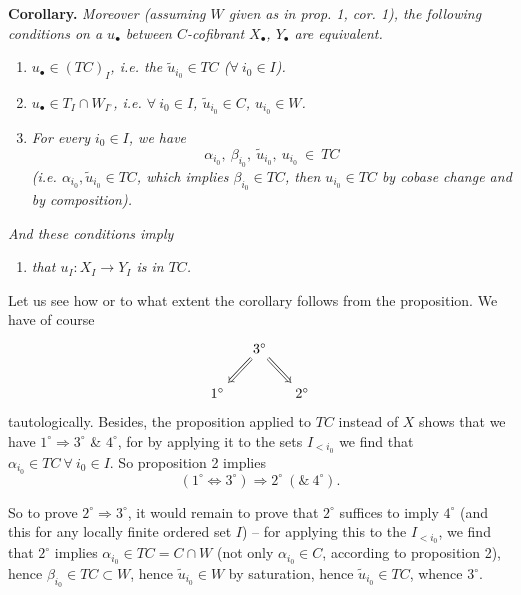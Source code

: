 \documentclass[11pt]{article}
\newcommand{\printedpage}[1]{\marginpar{\footnotesize p.~#1}}
\newcommand{\msp}[1]{\marginpar{\footnotesize [#1]}}
\begin{document}
\textbf{Corollary.} \textit{Moreover (assuming $W$ given as in prop. 1, cor. 1), the following conditions on a $u_{\bullet}$ between $C$-cofibrant $X_{\bullet}$, $Y_{\bullet}$ are equivalent.}
\begin{enumerate}
\item[$1^{\circ}$)] \textit{$u_{\bullet} \in (TC)_I$, i.e. the $\tilde{u}_{i_0} \in TC$ ($\forall\ i_0 \in I$).}
\item[$2^{\circ}$)] \textit{$u_{\bullet} \in T_I \cap W_{I^{\circ}}$, i.e. $\forall\ i_0 \in I$, $\tilde{u}_{i_0} \in C$, $u_{i_0} \in W$.} %
\item[$3^{\circ}$)] \textit{For every $i_0 \in I$, we have}
\[
\alpha_{i_0},\ \beta_{i_0},\ \tilde{u}_{i_0},\ u_{i_0} \ \in \ TC
\]
\textit{(i.e. $\alpha_{i_0}, \tilde{u}_{i_0} \in TC$, which implies $\beta_{i_0} \in TC$, then $u_{i_0} \in TC$ by cobase change and by composition).}
\end{enumerate}
\textit{And these conditions imply}
\begin{enumerate}
\item[$4^{\circ}$)] \textit{that $u_I : X_I \longrightarrow Y_I$ is in $TC$.}
\end{enumerate}

Let us see how or to what extent the corollary follows from the proposition. We have of course %
\printedpage{5}
\[
\begin{tikzcd}[column sep=small]
& 3^{\circ} \arrow[dl, Rightarrow] \arrow[dr, Rightarrow] & \\
1^{\circ} & & 2^{\circ}
\end{tikzcd}
\]
tautologically. Besides, the proposition applied to $TC$ instead of $X$ shows that we have $1^{\circ} \Longrightarrow 3^{\circ}$ \& $4^{\circ}$, for by applying it to the sets $I_{<i_0}$ we find that $\alpha_{i_0} \in TC\ \forall\ i_0 \in I$. So proposition 2 implies %
\[
(1^{\circ} \Longleftrightarrow 3^{\circ}) \Longrightarrow 2^{\circ}\ (\&\ 4^{\circ}).
\]

\msp{page 9}

So to prove $2^{\circ} \Longrightarrow 3^{\circ}$, it would remain to prove that $2^{\circ}$ suffices to imply $4^{\circ}$ (and this for any locally finite ordered set $I$) -- for applying this to the $I_{<i_0}$, we find that $2^{\circ}$ implies $\alpha_{i_0} \in TC = C \cap W$ (not only $\alpha_{i_0} \in C$, according to proposition 2), hence $\beta_{i_0} \in TC \subset W$, hence $\tilde{u}_{i_0} \in W$ by saturation, hence $\tilde{u}_{i_0} \in TC$, whence $3^{\circ}$.
\end{document}
